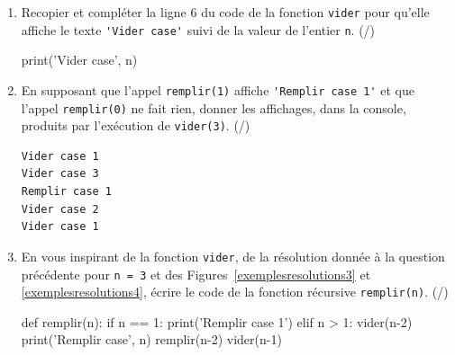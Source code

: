\begin{enumerate}[resume=monDS]
\item Recopier et compléter la ligne 6 du code de la fonction \texttt{vider} pour qu'elle affiche le texte \verb|'Vider case'| suivi de la valeur de l'entier \texttt{n}.  (/)

\begin{blocvisible}[height=2]
    \begin{CodePythontexAlt}[TaillePolice=\large, Largeur=1\linewidth,Centre,Lignes=true,PremLigne=1]{}
            print('Vider case', n)
    \end{CodePythontexAlt}
\end{blocvisible}

\medskip

\item En supposant que l'appel \texttt{remplir(1)} affiche \verb|'Remplir case 1'| et que l'appel \texttt{remplir(0)} ne fait rien, donner les affichages, dans la console, produits par l'exécution de \texttt{vider(3)}.  (/)
\begin{blocvisible}[height=5]
    \begin{verbatim}
Vider case 1
Vider case 3
Remplir case 1
Vider case 2
Vider case 1
\end{verbatim}
\end{blocvisible}

\pagebreak

\item En vous inspirant de la fonction \texttt{vider}, de la résolution donnée à la question précédente pour \texttt{n = 3} et des Figures~\ref{exemplesresolutions3} et \ref{exemplesresolutions4}, écrire le code de la fonction récursive \texttt{remplir(n)}.  (/)

\begin{blocvisible}[height=6]
    \begin{CodePythontexAlt}[TaillePolice=\large, Largeur=1\linewidth,Centre,Lignes=true,PremLigne=1]{}
    def remplir(n):
        if n == 1:
            print('Remplir case 1')
        elif n > 1:
            vider(n-2)
            print('Remplir case', n)
            remplir(n-2)
            vider(n-1)
    \end{CodePythontexAlt}
\end{blocvisible}
\end{enumerate}